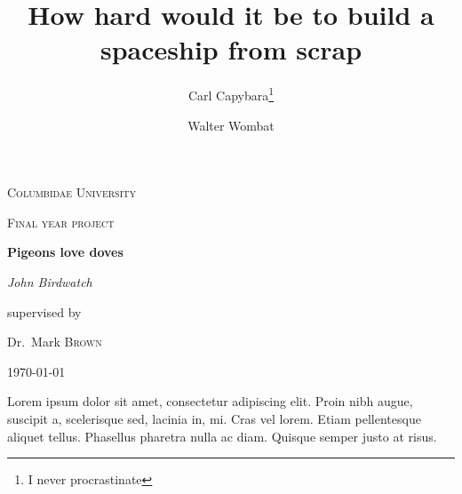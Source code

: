 \documentclass[12pt,a4paper]{article}
\title{How hard would it be to build a spaceship from scrap}
\author{Carl Capybara\thanks{I never procrastinate} \and Walter Wombat}
\begin{document}
  
  \begin{titlepage}
    \centering
    {\scshape\LARGE Columbidae University \par}
    \vspace{1cm}
    {\scshape\Large Final year project\par}
    \vspace{1.5cm}
    {\huge\bfseries Pigeons love doves\par}
    \vspace{2cm}
    {\Large\itshape John Birdwatch\par}
    \vfill
    supervised by\par
    Dr.~Mark \textsc{Brown}

    \vfill

    {\large \today\par}
  \end{titlepage}
  
  Lorem ipsum dolor sit amet, consectetur adipiscing elit. Proin nibh augue, suscipit a, scelerisque sed, lacinia in, mi. Cras vel lorem. Etiam pellentesque aliquet tellus. Phasellus pharetra nulla ac diam. Quisque semper justo at risus.
    
\end{document}
